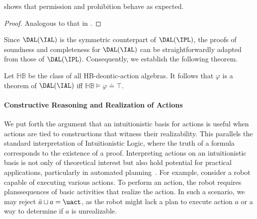  shows that permission and prohibition behave as expected.

\medskip
{}
\begin{proof}
	Analogous to that in .
\end{proof}
\medskip


Since $\DAL(\IAL)$ is the symmetric counterpart of $\DAL(\IPL)$, the proofs of soundness and completeness for $\DAL(\IAL)$ can be straightforwardly adapted from those of $\DAL(\IPL)$. Consequently, we establish the following theorem.

\medskip
\begin{theorem}\label{prop:completeness:heyting:actions}
	 Let $\mathbb{HB}$ be the class of all HB-deontic-action algebras.
	 It follows that $\varphi$ is a theorem of $\DAL(\IAL)$ iff $\mathbb{HB} \vDash {\varphi \doteq \top}$.
\end{theorem}

\paragraph{Constructive Reasoning and Realization of Actions}

We put forth the argument that an intuitionistic basis for actions is useful when actions are tied to constructions that witness their realizability.
This parallels the standard interpretation of Intuitionistic Logic, where the truth of a formula corresponds to the existence of a proof.
Interpreting actions on an intuitionistic basis is not only of theoretical interest but also hold potential for practical applications, particularly in automated planning~\cite{GNT:2016}.
For example, consider a robot capable of executing various actions.
To perform an action, the robot requires plans\textemdash sequences of basic activities that realize the action.
In such a scenario, we may reject $\bar{a} \sqcup a = \uact$, as the robot might lack a plan to execute action $a$ or a way to determine if $a$ is unrealizable.

